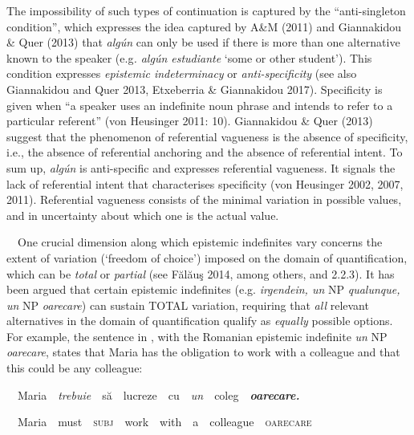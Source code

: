\begin{styleStandard}
The impossibility of such types of continuation is captured by the “anti-singleton condition”, which expresses the idea captured by A\&M (2011) and Giannakidou \& Quer (2013) that \textit{algún} can only be used if there is more than one alternative known to the speaker (e.g\textit{. algún estudiante} ‘some or other student’). This condition expresses \textit{epistemic indeterminacy} or \textit{anti-specificity} (see also Giannakidou and Quer 2013, Etxeberria \& Giannakidou 2017). Specificity is given when “a speaker uses an indefinite noun phrase and intends to refer to a particular referent” (von Heusinger 2011: 10). Giannakidou \& Quer (2013) suggest that the phenomenon of referential vagueness is the absence of specificity, i.e., the absence of referential anchoring and the absence of referential intent. To sum up, \textit{algún} is anti-specific and expresses referential vagueness. It signals the lack of referential intent that characterises specificity (von Heusinger 2002, 2007, 2011). Referential vagueness consists of the minimal variation in possible values, and in uncertainty about which one is the actual value. 
\end{styleStandard}

\begin{styleStandard}
\ \ One crucial dimension along which epistemic indefinites vary concerns the extent of variation (‘freedom of choice’) imposed on the domain of quantification, which can be \textit{total }or \textit{partial} (see Fălăuş 2014, among others, and 2.2.3). It has been argued that certain epistemic indefinites (e.g. \textit{irgendein, un }NP \textit{qualunque, un }NP\textit{ oarecare}) can sustain TOTAL variation, requiring that \textit{all }relevant alternatives in the domain of quantification qualify as \textit{equally} possible options. For example, the sentence in , with the Romanian epistemic indefinite \textit{un }NP\textit{ oarecare}, states that Maria has the obligation to work with a colleague and that this could be any colleague:
\end{styleStandard}

\begin{styleStandard}
\label{bkm:Ref533761905}\ \ Maria\ \ \textit{trebuie}\ \ să\ \ lucreze\ \ cu\ \ \textit{un}\ \ coleg\ \ \textbf{\textit{oarecare.}}
\end{styleStandard}

\begin{styleStandard}
\ \ Maria\ \ must\ \ \textsc{subj}\ \ work\ \ with\ \ a\ \ colleague\ \ \textsc{oarecare}
\end{styleStandard}

